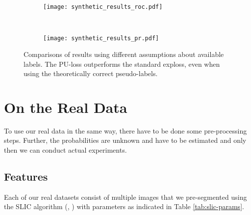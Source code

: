 \begin{figure}[ht]
	\centering
	\begin{subfigure}[h]{0.49\textwidth}
	\texttt{[image: synthetic\_results\_roc.pdf]}	
	\end{subfigure}
	~
	\begin{subfigure}[h]{0.49\textwidth}
	\texttt{[image: synthetic\_results\_pr.pdf]}	
	\end{subfigure}
	\caption{Comparisons of results using different assumptions about available labels. The PU-loss outperforms the standard exploss, even when using the theoretically correct pseudo-labels.}
	\label{fig:synthetic_results}
\end{figure}


\section{On the Real Data}
\label{sec:real-data}
To use our real data in the same way, there have to be done some pre-processing steps. Further, the probabilities are unknown and have to be estimated and only then we can conduct actual experiments.
\subsection{Features}
Each of our real datasets consist of multiple images that we pre-segmented using the SLIC algorithm (\cite{achanta2010slic}, \cite{vedaldi08vlfeat}) with parameters as indicated in Table \ref{tab:slic-params}. 


